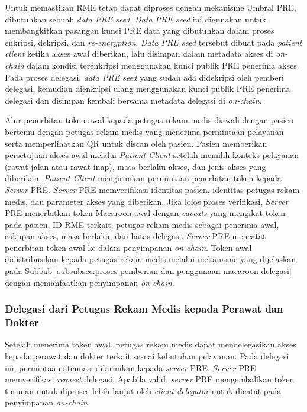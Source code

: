 \documentclass[bahasa, 12pt, a4paper, onecolumn, oneside, final]{report}
\begin{document}
Untuk memastikan RME tetap dapat diproses dengan mekanisme Umbral PRE, dibutuhkan sebuah \textit{data PRE seed}. \textit{Data PRE seed} ini digunakan untuk membangkitkan pasangan kunci PRE data yang dibutuhkan dalam proses enkripsi, dekripsi, dan \textit{re-encryption}. \textit{Data PRE seed} tersebut dibuat pada \textit{patient client} ketika akses awal diberikan, lalu disimpan dalam metadata akses di \textit{on-chain} dalam kondisi terenkripsi menggunakan kunci publik PRE penerima akses. Pada proses delegasi, \textit{data PRE seed} yang sudah ada didekripsi oleh pemberi delegasi, kemudian dienkripsi ulang menggunakan kunci publik PRE penerima delegasi dan disimpan kembali bersama metadata delegasi di \textit{on-chain}.

Alur penerbitan token awal kepada petugas rekam medis diawali dengan pasien bertemu dengan petugas rekam medis yang menerima permintaan pelayanan serta memperlihatkan QR untuk discan oleh pasien. Pasien memberikan persetujuan akses awal melalui \textit{Patient Client} setelah memilih konteks pelayanan (rawat jalan atau rawat inap), masa berlaku akses, dan jenis akses yang diberikan. \textit{Patient Client} mengirimkan permintaan penerbitan token kepada \textit{Server} PRE. \textit{Server} PRE memverifikasi identitas pasien, identitas petugas rekam medis, dan parameter akses yang diberikan. Jika lolos proses verifikasi, \textit{Server} PRE menerbitkan token Macaroon awal dengan \textit{caveats} yang mengikat token pada pasien, ID RME terkait, petugas rekam medis sebagai penerima awal, cakupan akses, masa berlaku, dan batas delegasi. \textit{Server} PRE mencatat penerbitan token awal ke dalam penyimpanan \textit{on-chain}. Token awal didistribusikan kepada petugas rekam medis melalui mekanisme yang dijelaskan pada Subbab \ref{subsubsec:proses-pemberian-dan-penggunaan-macaroon-delegasi} dengan memanfaatkan penyimpanan \textit{on-chain}.

\subsubsection{Delegasi dari Petugas Rekam Medis kepada Perawat dan Dokter}
\label{subsec:delegasi-dari-petugas-rekam-medis-kepada-perawat-dan-dokter}

Setelah menerima token awal, petugas rekam medis dapat mendelegasikan akses kepada perawat dan dokter terkait sesuai kebutuhan pelayanan. Pada delegasi ini, permintaan atenuasi dikirimkan kepada \textit{server} PRE. \textit{Server} PRE memverifikasi \textit{request} delegasi. Apabila valid, \textit{server} PRE mengembalikan token turunan untuk diproses lebih lanjut oleh \textit{client delegator} untuk dicatat pada penyimpanan \textit{on-chain}.
\end{document}
